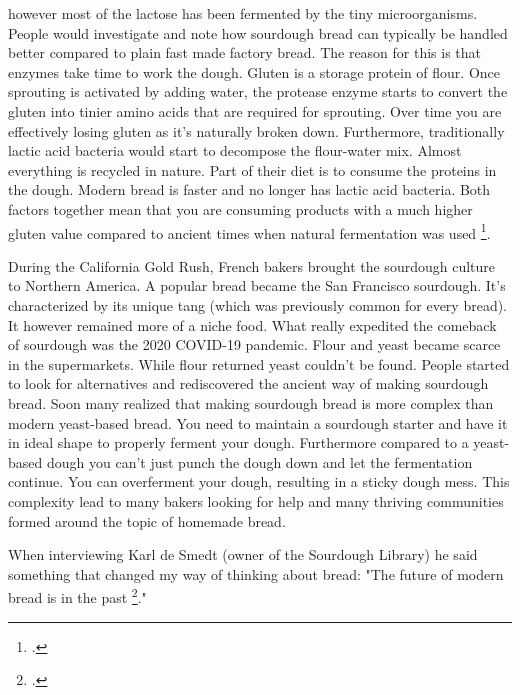 however most of the lactose has been fermented by
the tiny microorganisms. People would investigate and
note how sourdough bread can typically be handled better
compared to plain fast made factory bread. The
reason for this is that enzymes take time to work the dough.
Gluten is a storage protein of flour. Once
sprouting is activated by adding water, the protease
enzyme starts to convert the gluten into tinier amino acids
that are required for sprouting. Over time you are effectively
losing gluten as it's naturally broken down. Furthermore,
traditionally lactic acid bacteria would start to decompose
the flour-water mix. Almost everything is recycled in nature.
Part of their diet is to consume the proteins in the dough.
Modern bread is faster and no longer has lactic acid bacteria.
Both factors together mean that you are consuming products
with a much higher gluten value compared to ancient times
when natural fermentation was used \footcite{raffaella+di+cagno}.

During the California Gold Rush, French bakers brought the sourdough
culture to Northern America. A popular bread became the
San Francisco sourdough. It's characterized by its unique
tang (which was previously common for every bread). It
however remained more of a niche food. What really expedited
the comeback of sourdough was the 2020 COVID-19 pandemic.
Flour and yeast became scarce in the supermarkets. While
flour returned yeast couldn't be found. People started
to look for alternatives and rediscovered the ancient
way of making sourdough bread. Soon many realized
that making sourdough bread is more complex than modern
yeast-based bread. You need to maintain a sourdough starter
and have it in ideal shape to properly ferment your dough.
Furthermore compared to a yeast-based dough you can't just
punch the dough down and let the fermentation continue.
You can overferment your dough, resulting in a sticky
dough mess. This complexity lead to many bakers looking
for help and many thriving communities formed around
the topic of homemade bread.

When interviewing Karl de Smedt (owner of the Sourdough
Library) he said something that changed my way of thinking
about bread: "The future of
modern bread is in the past \footcite{interview+karl+de+smedt}."
